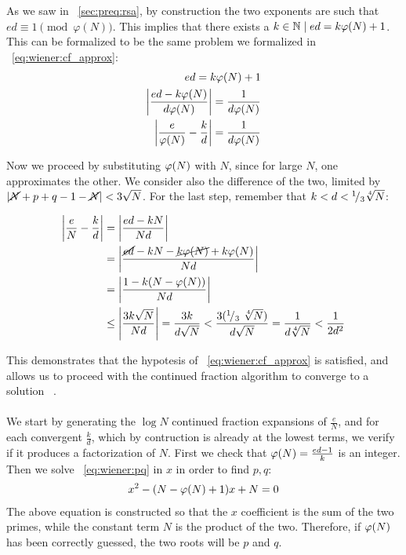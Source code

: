 As we saw in ~\ref{sec:preq:rsa}, by construction the two exponents are such that
$ed \equiv 1 \pmod{\varphi(N)}$. This implies that there exists a
$k \in \mathbb{N} \mid ed = k\varphi(N) + 1$. This can be formalized to be
the same problem we formalized in ~\ref{eq:wiener:cf_approx}:
\begin{align*}
  ed = k\varphi(N) + 1 \\
  \left|\frac{ed - k\varphi(N)}{d\varphi(N)}\right| = \frac{1}{d\varphi(N)} \\
  \left|\frac{e}{\varphi(N)} - \frac{k}{d}\right| = \frac{1}{d\varphi(N)} \\
\end{align*}

Now we proceed by substituting $\varphi(N)$ with $N$, since for large $N$, one
approximates the other. We consider also the difference of the two, limited by
$\left|\cancel{N} + p + q - 1 - \cancel{N}\right| < 3\sqrt{N}$.
For the last step, remember that $k < d < {}^{1}\!/_{3}\sqrt[4]{N}$:

\begin{align*}
  \left|\frac{e}{N} - \frac{k}{d}\right| &= \left|\frac{ed - kN}{Nd}\right| \\
  &= \left|\frac{\cancel{ed} -kN - \cancel{k\varphi(N)} + k\varphi(N)}{Nd}\right| \\
  &= \left|\frac{1-k(N-\varphi(N))}{Nd}\right| \\
  &\leq \left|\frac{3k\sqrt{N}}{Nd}\right|
  = \frac{3k}{d\sqrt{N}}
  < \frac{3({}^{1}\!/_{3}\ \sqrt[4]{N})}{d\sqrt{N}}
  = \frac{1}{d\sqrt[4]{N}} < \frac{1}{2d^2}
\end{align*}

This demonstrates that the hypotesis of ~\ref{eq:wiener:cf_approx} is satisfied,
and allows us to proceed with the continued fraction algorithm to converge to a
solution ~\cite{20years}.

\paragraph{}
We start by generating the $\log N$ continued fraction expansions of
$\frac{e}{N}$, and for each convergent $\frac{k}{d}$,
which by contruction is already at the lowest terms, we verify if it produces a
factorization of $N$.
First we check that $\varphi(N) = \frac{ed-1}{k}$ is
an integer. Then we solve ~\ref{eq:wiener:pq} in $x$ in order to find $p, q$:
\begin{align}
  \label{eq:wiener:pq}
  x^2 - (N - \varphi(N) + 1)x + N = 0
\end{align}
The above equation is constructed so that the $x$ coefficient is the sum of the
two primes, while the constant term $N$ is the product of the two. Therefore, if
$\varphi(N)$ has been correctly guessed, the two roots will be $p$ and $q$.

